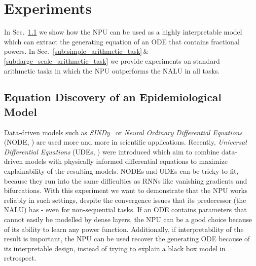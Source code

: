 \documentclass[9pt]{article}
\begin{document}
\section{Experiments}%
\label{sec:experiments}

In Sec.~\ref{sub:fractional_sir_model} we show how the NPU can be used as a
highly interpretable model which can extract the generating equation of an ODE
that contains fractional powers.
In Sec.~\ref{sub:simple_arithmetic_task}\,\&\,\ref{sub:large_scale_arithmetic_task}
we provide experiments on standard arithmetic tasks in which the NPU outperforms
the NALU in all tasks.

\subsection{Equation Discovery of an Epidemiological Model}%
\label{sub:fractional_sir_model}

Data-driven models such as \emph{SINDy}~\citep{champion_data-driven_2019} or
\emph{Neural Ordinary Differential Equations} (NODE, \cite{chen_neural_2019})
are used more and more in scientific applications.
Recently, \emph{Universal Differential Equations} (UDEs,
\cite{rackauckas_universal_2020}) were introduced which aim to combine
data-driven models with physically informed differential equations to maximize
explainability of the resulting models.
NODEs and UDEs can be tricky to fit, because they run into the same
difficulties as RNNs like vanishing gradients and bifurcations. With this
experiment we want to demonstrate that the NPU works reliably in such settings,
despite the convergence issues that its predecessor (the NALU) has -
even for non-sequential tasks.
If an ODE contains parameters that cannot easily be modelled by dense layers,
the NPU can be a good choice because of its ability to learn any power
function.  Additionally, if interpretability of the result is important, the
NPU can be used recover the generating ODE because of its interpretable design,
instead of trying to explain a black box model in retrospect.
\end{document}
